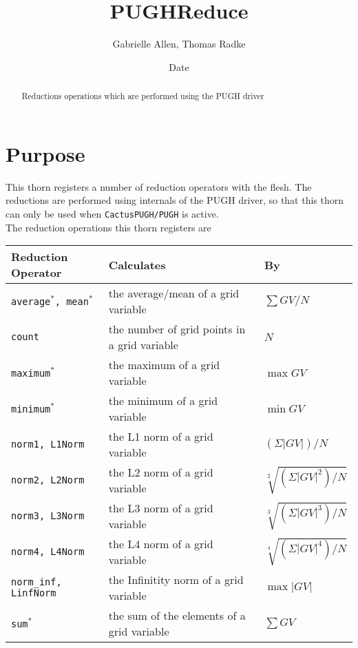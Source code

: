 \documentclass{article}
\begin{document}
\title{PUGHReduce}
\author{Gabrielle Allen, Thomas Radke}
\date{$ $Date$ $}
\maketitle


\begin{abstract}
Reductions operations which are performed using the PUGH driver
\end{abstract}

\section{Purpose}
%
This thorn registers a number of reduction operators with the flesh. The
reductions are performed using internals of the PUGH driver, so that this
thorn can only be used when {\tt CactusPUGH/PUGH} is active.\\

The reduction operations this thorn registers are\\

\begin{tabular}{|l|l|l|}
\hline
Reduction Operator & Calculates & By \\
\hline
{\tt average$^*$, mean$^*$}   & the average/mean of a grid variable & $ \sum{ GV }/N $ \\
{\tt count}   & the number of grid points in a grid variable & $ N $ \\
{\tt maximum$^*$}   & the maximum of a grid variable & $ \max{ GV } $ \\
{\tt minimum$^*$}   & the minimum of a grid variable & $ \min{ GV } $ \\
{\tt norm1, L1Norm}         & the L1 norm of a grid variable & $ \left(\Sigma |GV| \right)/N $ \\
{\tt norm2, L2Norm}         & the L2 norm of a grid variable & $ \sqrt[2]{(\Sigma |GV|^2)/N} $ \\
{\tt norm3, L3Norm}         & the L3 norm of a grid variable & $ \sqrt[3]{(\Sigma |GV|^3)/N} $ \\
{\tt norm4, L4Norm}         & the L4 norm of a grid variable & $ \sqrt[4]{(\Sigma |GV|^4)/N} $ \\
{\tt norm\_inf, LinfNorm}     & the Infinitity norm of a grid variable & $ \max{| GV |} $ \\
{\tt sum$^*$}       & the sum of the elements of a grid variable & $ \sum{ GV } $ \\
\hline
\end{tabular}\\
\end{document}
